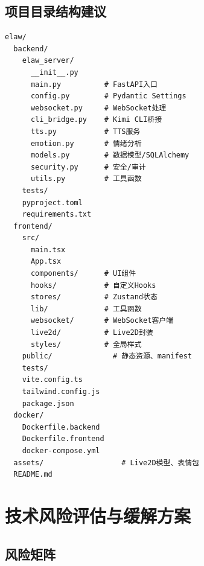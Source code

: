 \documentclass[fontset=mac,a4paper,11pt]{ctexart}
\begin{document}
\subsection{项目目录结构建议}

\begin{lstlisting}[caption=推荐目录结构]
elaw/
  backend/
    elaw_server/
      __init__.py
      main.py          # FastAPI入口
      config.py        # Pydantic Settings
      websocket.py     # WebSocket处理
      cli_bridge.py    # Kimi CLI桥接
      tts.py           # TTS服务
      emotion.py       # 情绪分析
      models.py        # 数据模型/SQLAlchemy
      security.py      # 安全/审计
      utils.py         # 工具函数
    tests/
    pyproject.toml
    requirements.txt
  frontend/
    src/
      main.tsx
      App.tsx
      components/      # UI组件
      hooks/           # 自定义Hooks
      stores/          # Zustand状态
      lib/             # 工具函数
      websocket/       # WebSocket客户端
      live2d/          # Live2D封装
      styles/          # 全局样式
    public/              # 静态资源、manifest
    tests/
    vite.config.ts
    tailwind.config.js
    package.json
  docker/
    Dockerfile.backend
    Dockerfile.frontend
    docker-compose.yml
  assets/                  # Live2D模型、表情包
  README.md
\end{lstlisting}

\section{技术风险评估与缓解方案}

\subsection{风险矩阵}
\end{document}
